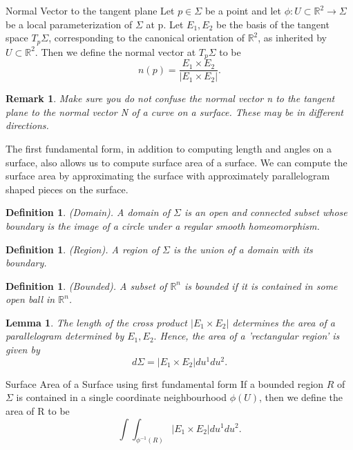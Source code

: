 \documentclass[twoside]{article}
\newtheorem{lemma}[theorem]{Lemma}
\newtheorem{definition}[theorem]{Definition}
\newtheorem{remark}[theorem]{Remark}
\begin{document}
\begin{definition_exam}{Normal Vector to the tangent plane}{} Let $p \in \Sigma$ be a point and let $\phi: U \subset \mathbb{R}^2 \rightarrow \Sigma$ be a local parameterization of $\Sigma$ at p. Let $E_1, E_2$ be the basis of the tangent space $T_p\Sigma$, corresponding to the canonical orientation of $\mathbb{R}^2$, as inherited by $U \subset \mathbb{R}^2$. Then we define the normal vector at $T_p\Sigma$ to be 
$$
n(p) = \frac{E_1 \times E_2}{|E_1 \times E_2|}.
$$
\end{definition_exam}

\begin{remark}Make sure you do not confuse the normal vector n to the tangent plane to the normal vector N of a curve on a surface. These may be in different directions.
\end{remark}

The first fundamental form, in addition to computing length and angles on a surface, also allows us to compute surface area of a surface. We can compute the surface area by approximating the surface with approximately parallelogram shaped pieces on the surface.

\begin{definition}(Domain). A domain of $\Sigma$ is an open and connected subset whose boundary is the image of a circle under a regular smooth homeomorphism.
\end{definition}

\begin{definition}(Region). A region of $\Sigma$ is the union of a domain with its boundary.
\end{definition}


\begin{definition}(Bounded). A subset of $\mathbb{R}^n$ is bounded if it is contained in some open ball in $\mathbb{R}^n$.
\end{definition}

\begin{lemma}The length of the cross product $|E_1 \times E_2|$ determines the area of a parallelogram determined by $E_1, E_2.$ Hence, the area of a 'rectangular region' is given by 
$$
d\Sigma = |E_1 \times E_2|du^1du^2.
$$
\end{lemma}

\begin{definition_exam}{Surface Area of a Surface using first fundamental form}{} If a bounded region $R$ of $\Sigma$ is contained in a single coordinate neighbourhood $\phi(U)$, then we define the area of R to be 
$$
\int \int_{\phi^{-1}(R)}|E_1 \times E_2|du^1du^2.
$$
\end{definition_exam}
\end{document}
